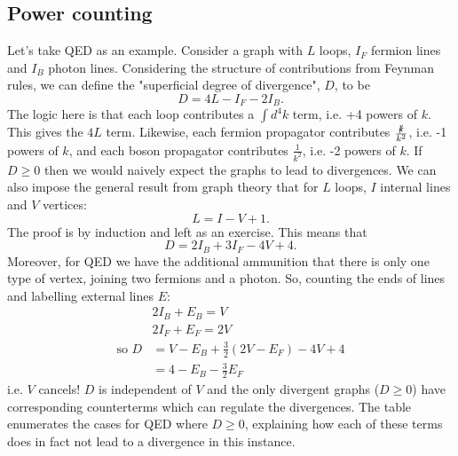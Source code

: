 \documentclass[a4paper,12pt]{article}
\begin{document}
\subsection{Power counting}
%
Let's take QED as an example. Consider a graph with $L$ loops, $I_F$ fermion lines and $I_B$ photon lines. Considering the structure of contributions from Feynman rules, we can define the "superficial degree of divergence", $D$, to be
\begin{equation}
D = 4L - I_F - 2I_B.
\end{equation}
The logic here is that each loop contributes a $\int d^4k$ term, i.e. +4 powers of $k$. This gives the $4L$ term. Likewise, each fermion propagator contributes $\frac{\slashed{k}}{k^2}$, i.e. -1 powers of $k$, and each boson propagator contributes $\frac{1}{k^2}$, i.e. -2 powers of $k$. If $D \geq 0 $ then we would naively expect the graphs to lead to divergences. We can also impose the general result from graph theory that for $L$ loops, $I$ internal lines and $V$ vertices:
\begin{equation}
L = I - V + 1.
\end{equation}
The proof is by induction and left as an exercise. This means that
\begin{equation}
D = 2I_B + 3I_F - 4V + 4.
\end{equation}
Moreover, for QED we have the additional ammunition that there is only one type of vertex, joining two fermions and a photon. So, counting the ends of lines and labelling external lines $E$:
\begin{equation}
\begin{split}
&2I_B + E_B = V \\
&2I_F + E_F = 2V \\
\text{so } D &= V-E_B + \frac{3}{2}(2V-E_F) - 4V + 4 \\
&= 4 - E_B - \frac{3}{2}E_F
\end{split}
\end{equation}
i.e. $V$ cancels! $D$ is independent of $V$ and the only divergent graphs ($D \geq 0$) have corresponding counterterms which can regulate the divergences. The table enumerates the cases for QED where $D \geq 0$, explaining how each of these terms does in fact not lead to a divergence in this instance.
\end{document}
